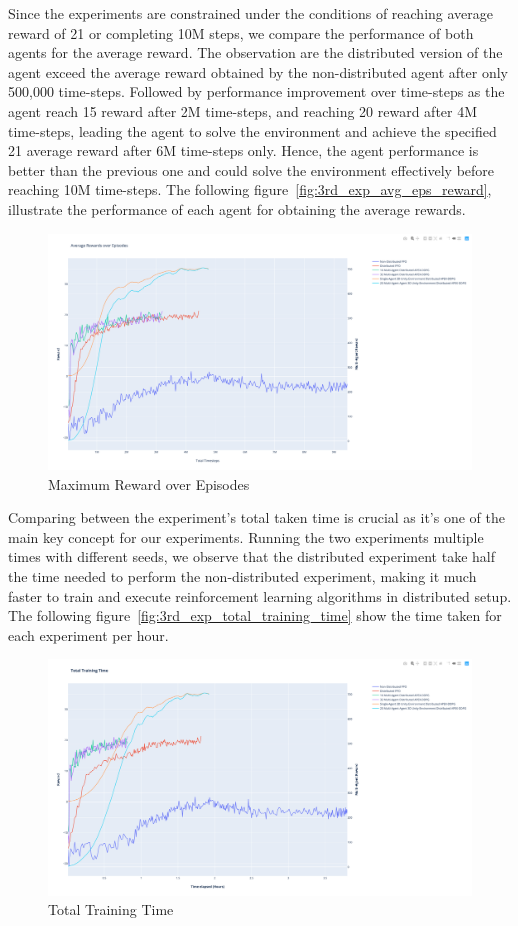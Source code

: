 Since the experiments are constrained under the conditions of reaching average reward of 21 or completing 10M steps, we compare the performance of both agents for the average reward. The observation are the distributed version of the agent exceed the average reward obtained by the non-distributed agent after only 500,000 time-steps. Followed by performance improvement over time-steps as the agent reach 15 reward after 2M time-steps, and reaching 20 reward after 4M time-steps, leading the agent to solve the environment and achieve the specified 21 average reward after 6M time-steps only. Hence, the agent performance is better than the previous one and could solve the environment effectively before reaching 10M time-steps. The following figure~\ref{fig:3rd_exp_avg_eps_reward}, illustrate the performance of each agent for obtaining the average rewards.
\begin{figure}[!htb]
		\centering
		\includegraphics[width=0.8\linewidth]{figures/exps/4th_exp/avg_eps_reward.png}
		\caption{Maximum Reward over Episodes}
		\label{fig:4th_exp_avg_eps_reward}
\end{figure}

Comparing between the experiment's total taken time is crucial as it's one of the main key concept for our experiments. Running the two experiments multiple times with different seeds, we observe that the distributed experiment take half the time needed to perform the non-distributed experiment, making it much faster to train and execute reinforcement learning algorithms in distributed setup. The following figure~\ref{fig:3rd_exp_total_training_time} show the time taken for each experiment per hour.
\begin{figure}[!htb]
		\centering
		\includegraphics[width=0.8\linewidth]{figures/exps/4th_exp/total_training_time.png}
		\caption{Total Training Time}
		\label{fig:4th_exp_total_training_time}
\end{figure}

